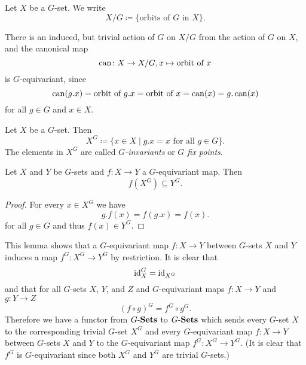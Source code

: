 \begin{defi}
  Let $X$ be a $G$-set.
  We write
  \[
              X/G
    \coloneqq \{
                \text{orbits of $G$ in $X$}
              \}.
  \]
\end{defi}


\begin{note}
  There is an induced, but trivial action of $G$ on $X/G$ from the action of $G$ on $X$, and the canonical map
  \[
            \operatorname{can}
    \colon  X \to X/G,
            x
    \mapsto \text{orbit of } x
  \]
  is $G$-equivariant, since
  \[
      \operatorname{can}(g.x)
    = \text{orbit of $g.x$}
    = \text{orbit of $x$}
    = \operatorname{can}(x)
    = g.\operatorname{can}(x)
  \]
  for all $g \in G$ and $x \in X$.
\end{note}


\begin{defi}
  Let $X$ be a $G$-set.
  Then
  \[
    X^G
    \coloneqq \{
                x \in X
              \mid
                  g.x
                = x
                \text{ for all }
                g \in G
              \}.
  \]
  The elements in $X^G$ are called \emph{$G$-invariants} or \emph{$G$ fix points}.
\end{defi}


\begin{lem}
  Let $X$ and $Y$ be $G$-sets and $f \colon X \to Y$ a $G$-equivariant map. Then
  \[
              f\left( X^G \right)
    \subseteq Y^G.
  \]
\end{lem}
\begin{proof}
  For every $x \in X^G$ we have
  \[
      g.f(x)
    = f(g.x)
    = f(x).
  \]
  for all $g \in G$ and thus $f(x) \in Y^G$.
\end{proof}


This lemma shows that a $G$-equivariant map $f \colon X \to Y$ between $G$-sets $X$ and $Y$ induces a map $f^G \colon X^G \to Y^G$ by restriction.
It is clear that
\[
    \operatorname{id}_X^G
  = \operatorname{id}_{X^G}
\]
and that for all $G$-sets $X$, $Y$, and $Z$ and $G$-equivariant maps $f \colon X \to Y$ and $g \colon Y \to Z$
\[
    (f \circ g)^G
  = f^G \circ g^G.
\]
Therefore we have a functor from $G\text{-}\mathbf{Sets}$ to $G\text{-}\mathbf{Sets}$ which sends every $G$-set $X$ to the corresponding trivial $G$-set $X^G$ and every $G$-equivariant map $f \colon X \to Y$ between $G$-sets $X$ and $Y$ to the $G$-equivariant map $f^G \colon X^G \to Y^G$.
(It is clear that $f^G$ is $G$-equivariant since both $X^G$ and $Y^G$ are trivial $G$-sets.)


